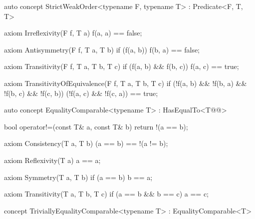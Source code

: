 \documentclass[american,twoside]{book}
\begin{document}
\begin{itemdescr}
\pnum 
{}
\end{itemdescr}

\color{ccadd}
\begin{itemdecl}
auto concept StrictWeakOrder<typename F, typename T> : Predicate<F, T, T> {

  axiom Irreflexivity(F f, T a) { f(a, a) == false; }

  axiom Antisymmetry(F f, T a, T b) { 
    if (f(a, b)) 
      f(b, a) == false;
  }

  axiom Transitivity(F f, T a, T b, T c) {
    if (f(a, b) && f(b, c)) 
      f(a, c) == true;
  }

  axiom TransitivityOfEquivalence(F f, T a, T b, T c) {
    if (!f(a, b) && !f(b, a) && !f(b, c) && !f(c, b))
      (!f(a, c) && !f(c, a)) == true;
  }
}
\end{itemdecl}
\color{addclr}

\begin{itemdescr}
\pnum 
{}
\end{itemdescr}

\begin{itemdecl}
auto concept EqualityComparable<typename T> : HasEqualTo<T@@> {
  bool operator!=(const T& a, const T& b) { return !(a == b); }

  axiom Consistency(T a, T b) {
    (a == b) == !(a != b);
  }

  axiom Reflexivity(T a) { a == a; }

  axiom Symmetry(T a, T b) { 
    if (a == b) 
      b == a; 
  }

  axiom Transitivity(T a, T b, T c) {
    if (a == b && b == c) 
      a == c;
  }
}
\end{itemdecl}

\begin{itemdescr}
\pnum
{}
\end{itemdescr}

\begin{itemdecl}
concept TriviallyEqualityComparable<typename T> : EqualityComparable<T> { }
\end{itemdecl}
\end{document}
